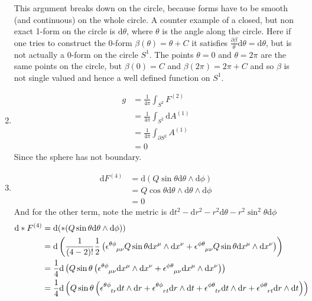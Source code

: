 \documentclass[12pt,a4]{article}
\newcommand{\e}{\mathrm{d}}
\begin{document}
\begin{enumerate}
    This argument breaks down on the circle, because forms have to be smooth (and continuous) on the whole circle.
    A counter example of a closed, but non exact 1-form on the circle is $\e \theta$, where $\theta$ is the angle along the circle.
    Here if one tries to construct the 0-form $\beta(\theta) = \theta + C$ it satisfies $\frac{\partial \beta}{\theta} \e \theta = \e \theta$, but is not actually a 0-form on the circle $S^1$.
    The points $\theta = 0$ and $\theta = 2 \pi$ are the same points on the circle, but $\beta(0) = C$ and $\beta(2 \pi) = 2 \pi + C$ and so $\beta$ is not single valued and hence a well defined function on $S^1$.
  \item
    \begin{align*}
      g &= \frac{1}{4 \pi } \int_{S^2} F^{(2)} \\
        &= \frac{1}{4 \pi } \int_{S^2} \e A^{(1)} \\
        &= \frac{1}{4 \pi } \int_{\partial S^2} A^{(1)} \\
        &= 0 
    \end{align*}
    Since the sphere has not boundary.
  \item
    \begin{align*}
      \e F^{(4)} &= \e (Q \sin \theta \e \theta \wedge \e \phi)\\
                 &= Q \cos \theta \e \theta \wedge \e \theta \wedge \e \phi\\
                 &= 0 
    \end{align*}
    And for the other term, note the metric is $\e t^2 - \e r^2 - r^2 \e \theta - r^2 \sin^2 \theta \e \phi$
    \begin{align*}
      \e * F^{(4)} &= \e (* (Q \sin \theta \e \theta \wedge \e \phi))\\
                   &= \e \left(\frac{1}{(4 - 2)!}\frac{1}{2} \left(\tensor{\epsilon}{^\theta ^\phi_\mu_\nu} Q \sin \theta \e x^\mu \wedge \e x^\nu + \tensor{\epsilon}{^\phi^\theta _\mu_\nu} Q \sin \theta \e x^\mu \wedge \e x^\nu\right)\right)\\
                   &= \frac{1}{4}\e \left(Q \sin \theta \left(\tensor{\epsilon}{^\theta ^\phi_\mu_\nu}  \e x^\mu \wedge \e x^\nu + \tensor{\epsilon}{^\phi^\theta _\mu_\nu} \e x^\mu \wedge \e x^\nu\right)\right)\\
                   &= \frac{1}{4}\e \left(Q \sin \theta \left( \tensor{\epsilon}{^\theta ^\phi_t_r} \e t \wedge \e r + \tensor{\epsilon}{^\theta ^\phi_r_t} \e r \wedge \e t + \tensor{\epsilon}{^\phi^\theta _t_r} \e t \wedge \e r + \tensor{\epsilon}{^\phi^\theta _r_t} \e r \wedge \e t\right)\right)

\end{align*}
\end{enumerate}
\end{document}
